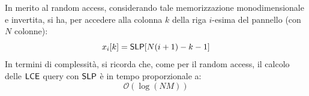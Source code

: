 In merito al random access, considerando tale memorizzazione monodimensionale e
invertita, si ha, per accedere alla colonna $k$ della riga $i$-esima del
pannello (con $N$ colonne): 
\begin{equation}
  \label{eq:raslpform}
  x_i[k] = \mbox{\rm {\sf SLP}}[N(i+1)-k-1]
\end{equation}
In termini di complessità, si ricorda che, come per il random access,
il calcolo delle $\mbox{\rm {\sf LCE}}$ query con $\mbox{\rm {\sf SLP}}$ è in tempo proporzionale a: 
\begin{equation}
  \label{eq:timelce}
  \mathcal{O}(\log (\mathit{NM}))
\end{equation}